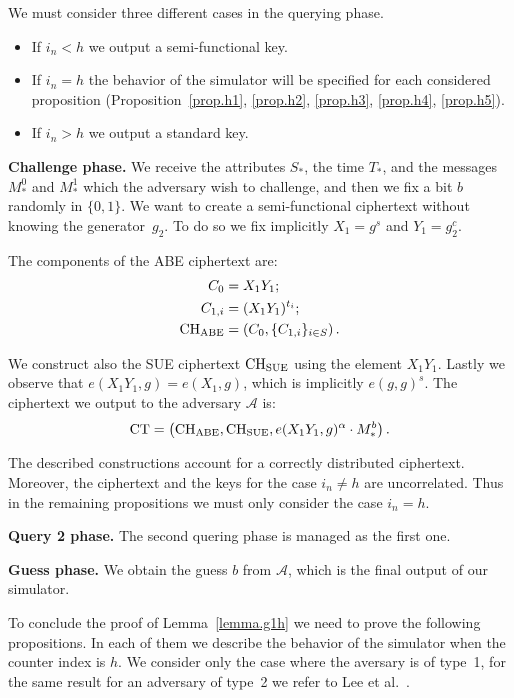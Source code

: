 \documentclass[a4paper,10pt]{article}
\newcommand{\phase}[1]{\textbf{#1 phase.} \hspace{0pt}}
\newcommand{\typeone}{type~1}
\newcommand{\typetwo}{type~2}
\begin{document}
	We must consider three different cases in the querying phase.
	\begin{itemize}
		\item
		If $i_n<h$ we output a semi-functional key.
		\item
		If $i_n=h$ the behavior of the simulator will be specified for each considered proposition (Proposition~\ref{prop.h1}, \ref{prop.h2}, \ref{prop.h3}, \ref{prop.h4}, \ref{prop.h5}).
		\item
		If $i_n>h$ we output a standard key.
	\end{itemize}
	
	\phase{Challenge}
	We receive the attributes $S_*$, the time $T_*$, and the messages $M_*^0$ and $M_*^1$ which the adversary wish to challenge, and then we fix a bit $b$ randomly in $\{0,1\}$.
	We want to create a semi-functional ciphertext without knowing the generator~$g_2$.
	To do so we fix implicitly $X_1=g^s$ and $Y_1=g_2^c$.
	
	The components of the ABE ciphertext are:
		\begin{align*}
			C_0&=X_1 Y_1;\\
			C_{1,i}&=(X_1 Y_1)^{t_i};\\
			\mathrm{CH}_\textnormal{ABE}&=\left(C_0,\{C_{1,i}\}_{i\in S}\right).
		\end{align*}
		
	We construct also the SUE ciphertext $\mathrm{CH}_\textnormal{SUE}$ using the element $X_1Y_1$.
	Lastly we observe that $e(X_1Y_1,g)=e(X_1,g)$, which is implicitly $e(g,g)^s$.
	The ciphertext we output to the adversary $\mathcal{A}$ is:
	\[
		\mathrm{CT}=\left(\mathrm{CH}_\textnormal{ABE},\mathrm{CH}_\textnormal{SUE},e(X_1Y_1,g)^\alpha \cdot M_*^b\right).
	\]
	
	The described constructions account for a correctly distributed ciphertext. Moreover, the ciphertext and the keys for the case $i_n\neq h$ are uncorrelated. Thus in the remaining propositions we must only consider the case $i_n=h$.
		
	\phase{Query 2}
	The second quering phase is managed as the first one.
	
	\phase{Guess}
	We obtain the guess $b$ from $\mathcal{A}$, which is the final output of our simulator.
	
	\vspace{0.5em} 

	To conclude the proof of Lemma~\ref{lemma.g1h} we need to prove the following propositions.
	In each of them we describe the behavior of the simulator when the counter index is $h$. We consider only the case where the aversary is of \typeone{}, for the same result for an adversary of \typetwo{} we refer to Lee et al.~\cite{lee2013RSABE}.
	
\end{document}
